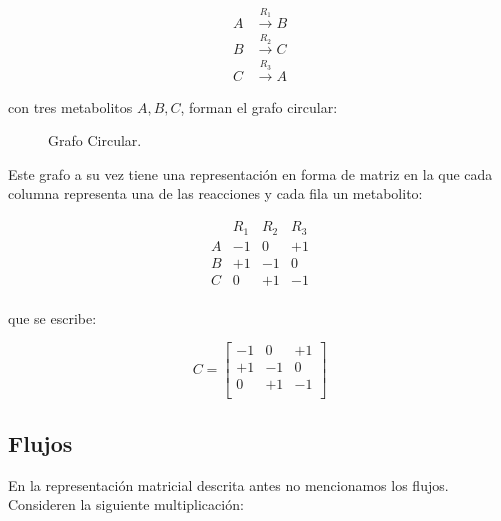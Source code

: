 \documentclass[12pt,spanish]{article}
\begin{document}
\begin{align}\label{eq:R1}
  A  &\xrightarrow{R_1} B \\
  B  &\xrightarrow{R_2} C \nonumber \\
  C  &\xrightarrow{R_3} A \nonumber
\end{align}

con tres metabolitos $A, B, C$, forman el grafo circular:

\begin{figure}[ht]
  \centering
  \caption{Grafo Circular.}
  \label{fig:Circular}
\end{figure}

Este grafo a su vez tiene una representación en forma de matriz en la que cada columna representa una de las reacciones y cada fila un metabolito:

\begin{equation}
  \begin{matrix}
    & R_1 & R_2 & R_3\\
    A & -1 &  0 & +1\\
    B & +1 & -1 & 0\\
    C &  0 & +1 & -1\\
  \end{matrix}
\end{equation}

que se escribe:

\begin{equation}
  C = \begin{bmatrix}
  -1 &  0 & +1\\
  +1 & -1 & 0\\
  0 & +1 & -1\\
\end{bmatrix}
\end{equation}

\subsection{Flujos}
En la representación matricial descrita antes no mencionamos los flujos. Consideren la siguiente multiplicación:
\end{document}
